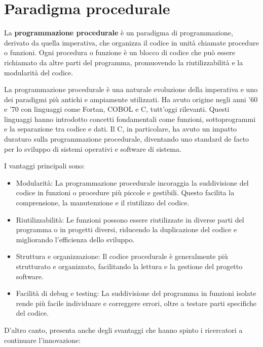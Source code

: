 \documentclass[
  letterpaper,
  DIV=11,
  numbers=noendperiod]{scrreprt}
\providecommand{\tightlist}{%
  \setlength{\itemsep}{0pt}\setlength{\parskip}{0pt}}\usepackage{longtable,booktabs,array}
\begin{document}
\section{Paradigma procedurale}\label{paradigma-procedurale}

La \textbf{programmazione procedurale} è un paradigma di programmazione,
derivato da quella imperativa, che organizza il codice in unità chiamate
procedure o funzioni. Ogni procedura o funzione è un blocco di codice
che può essere richiamato da altre parti del programma, promuovendo la
riutilizzabilità e la modularità del codice.

La programmazione procedurale è una naturale evoluzione della imperativa
e uno dei paradigmi più antichi e ampiamente utilizzati. Ha avuto
origine negli anni '60 e '70 con linguaggi come Fortan, COBOL e C,
tutt'oggi rilevanti. Questi linguaggi hanno introdotto concetti
fondamentali come funzioni, sottoprogrammi e la separazione tra codice e
dati. Il C, in particolare, ha avuto un impatto duraturo sulla
programmazione procedurale, diventando uno standard de facto per lo
sviluppo di sistemi operativi e software di sistema.

I vantaggi principali sono:

\begin{itemize}
\tightlist
\item
  Modularità: La programmazione procedurale incoraggia la suddivisione
  del codice in funzioni o procedure più piccole e gestibili. Questo
  facilita la comprensione, la manutenzione e il riutilizzo del codice.
\item
  Riutilizzabilità: Le funzioni possono essere riutilizzate in diverse
  parti del programma o in progetti diversi, riducendo la duplicazione
  del codice e migliorando l'efficienza dello sviluppo.
\item
  Struttura e organizzazione: Il codice procedurale è generalmente più
  strutturato e organizzato, facilitando la lettura e la gestione del
  progetto software.
\item
  Facilità di debug e testing: La suddivisione del programma in funzioni
  isolate rende più facile individuare e correggere errori, oltre a
  testare parti specifiche del codice.
\end{itemize}

D'altro canto, presenta anche degli svantaggi che hanno spinto i
ricercatori a continuare l'innovazione:
\end{document}
